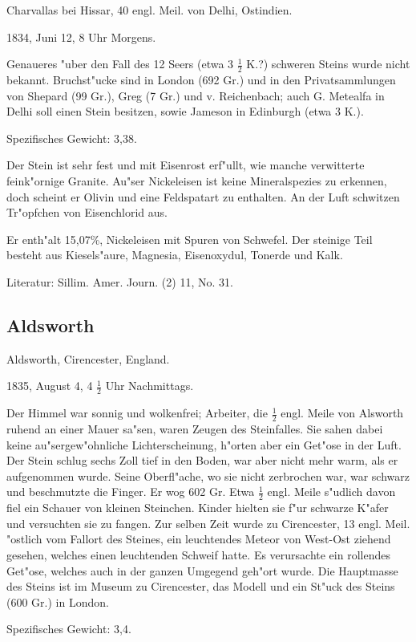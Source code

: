 \documentclass[a4paper, 11pt, oneside]{article}
\begin{document}
Charvallas bei Hissar, 40 engl. Meil. von Delhi, Ostindien.

1834, Juni 12, 8 Uhr Morgens.

Genaueres "uber den Fall des 12 Seers (etwa 3 $\frac{1}{2}$ K.?) schweren Steins wurde nicht bekannt. Bruchst"ucke sind in London (692 Gr.) und in den Privatsammlungen von Shepard (99 Gr.), Greg (7 Gr.) und v. Reichenbach; auch G. Metealfa in Delhi soll einen Stein besitzen, sowie Jameson in Edinburgh (etwa 3 K.).

Spezifisches Gewicht: 3,38.

Der Stein ist sehr fest und mit Eisenrost erf"ullt, wie manche verwitterte feink"ornige Granite. Au"ser Nickeleisen ist keine Mineralspezies zu erkennen, doch scheint er Olivin und eine Feldspatart zu enthalten. An der Luft schwitzen Tr"opfchen von Eisenchlorid aus.

Er enth"alt 15,07\%, Nickeleisen mit Spuren von Schwefel. Der steinige Teil besteht aus Kiesels"aure, Magnesia, Eisenoxydul, Tonerde und Kalk.

Literatur: Sillim. Amer. Journ. (2) 11, No. 31.

\subsection{Aldsworth}

Aldsworth, Cirencester, England.

1835, August 4, 4 $\frac{1}{2}$ Uhr Nachmittags.

Der Himmel war sonnig und wolkenfrei; Arbeiter, die $\frac{1}{2}$ engl. Meile von Alsworth ruhend an einer Mauer sa"sen, waren Zeugen des Steinfalles. Sie sahen dabei keine au"sergew"ohnliche Lichterscheinung, h"orten aber ein Get"ose in der Luft. Der Stein schlug sechs Zoll tief in den Boden, war aber nicht mehr warm, als er aufgenommen wurde. Seine Oberfl"ache, wo sie nicht zerbrochen war, war schwarz und beschmutzte die Finger. Er wog 602 Gr. Etwa $\frac{1}{2}$ engl. Meile s"udlich davon fiel ein Schauer von kleinen Steinchen. Kinder hielten sie f"ur schwarze K"afer und versuchten sie zu fangen. Zur selben Zeit wurde zu Cirencester, 13 engl. Meil. "ostlich vom Fallort des Steines, ein leuchtendes Meteor von West-Ost ziehend gesehen, welches einen leuchtenden Schweif hatte. Es verursachte ein rollendes Get"ose, welches auch in der ganzen Umgegend geh"ort wurde. Die Hauptmasse des Steins ist im Museum zu Cirencester, das Modell und ein St"uck des Steins (600 Gr.) in London.

Spezifisches Gewicht: 3,4.
\end{document}
